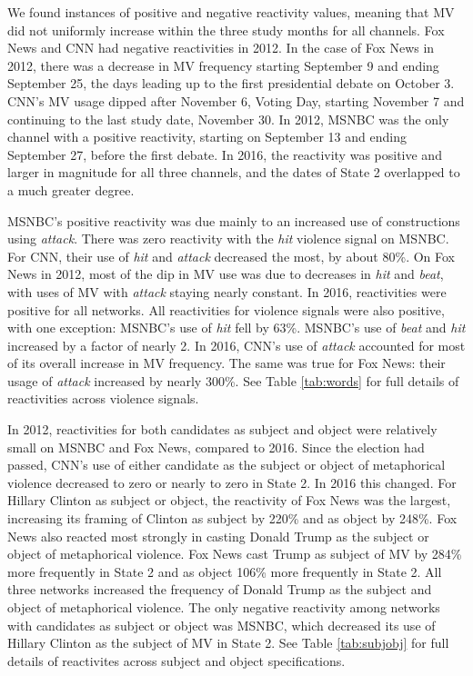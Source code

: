 We found instances of positive and negative reactivity values, 
meaning that MV did not uniformly increase within the
three study months for all channels. 
Fox News and CNN had negative reactivities in 2012. 
In the case of Fox News in 2012, 
there was a decrease in MV frequency starting September 9 and ending 
September 25, the days leading up to the first presidential debate on October 3.
CNN's MV usage dipped after November 6, Voting Day, starting 
November 7 and continuing to the last study date, November 30. 
In 2012, MSNBC was the only channel with
a positive reactivity, starting on September 13 and ending September 27,
before the first debate. In 2016, the reactivity was positive and larger
in magnitude for all three channels, and the dates of State 2 
overlapped to a much greater degree.  

MSNBC's positive reactivity was due 
mainly to an increased use of constructions using \emph{attack}. There was
zero reactivity with the \emph{hit} violence signal on MSNBC. For CNN, their use
of \emph{hit} and \emph{attack} decreased the most, by about 80\%.
On Fox News in 2012, most of the dip in MV use was due to decreases in 
\emph{hit} and \emph{beat}, with uses of MV with \emph{attack} staying nearly
constant. In 2016, reactivities were positive for all networks. All reactivities
for violence signals were also positive, with one exception: MSNBC's use of
\emph{hit} fell by 63\%. MSNBC's use of \emph{beat} and \emph{hit} increased
by a factor of nearly 2. In 2016, CNN's use of \emph{attack} accounted for 
most of its overall increase in MV frequency. 
The same was true for Fox News: their usage of
\emph{attack} increased by nearly 300\%. See Table \ref{tab:words}
for full details of reactivities across violence signals.

In 2012, reactivities for both candidates as
subject and object were relatively small on MSNBC and Fox News, compared to
2016. Since
the election had passed, CNN's use of either candidate as the subject or
object of metaphorical violence decreased to zero or nearly to zero in State 2. 
In 2016 this changed. For Hillary Clinton as subject or object, the
reactivity of Fox News was the largest, increasing its framing of Clinton
as subject by 220\% and as object by 248\%.
Fox News also reacted most strongly in casting 
Donald Trump as the subject or object of metaphorical violence. Fox News cast Trump 
as subject of MV by 284\% more frequently in State 2 and as
object 106\% more frequently in State 2.  
All three networks increased the 
frequency of Donald Trump as the subject and object of metaphorical violence. 
The only negative reactivity among networks with candidates as subject or object 
was MSNBC, which decreased its use of Hillary Clinton as the subject of MV 
in State 2.  See Table \ref{tab:subjobj} for 
full details of reactivites across subject and object specifications.
